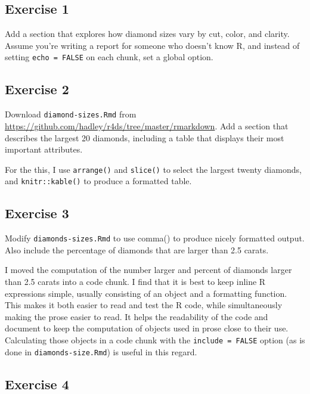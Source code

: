 \documentclass[]{book}
\theoremstyle{plain}
\theoremstyle{remark}
\theoremstyle{definition}
\theoremstyle{definition}
\theoremstyle{definition}
\theoremstyle{remark}
\begin{document}
\hypertarget{exercise-1-72}{%
\subsection{Exercise 1}\label{exercise-1-72}}

Add a section that explores how diamond sizes vary by cut, color, and
clarity. Assume you're writing a report for someone who doesn't know R,
and instead of setting \texttt{echo\ =\ FALSE} on each chunk, set a
global option.

\hypertarget{exercise-2-70}{%
\subsection{Exercise 2}\label{exercise-2-70}}

Download \texttt{diamond-sizes.Rmd} from
\url{https://github.com/hadley/r4ds/tree/master/rmarkdown}. Add a
section that describes the largest 20 diamonds, including a table that
displays their most important attributes.

For the this, I use \texttt{arrange()} and \texttt{slice()} to select
the largest twenty diamonds, and \texttt{knitr::kable()} to produce a
formatted table.

\hypertarget{exercise-3-56}{%
\subsection{Exercise 3}\label{exercise-3-56}}

Modify \texttt{diamonds-sizes.Rmd} to use comma() to produce nicely
formatted output. Also include the percentage of diamonds that are
larger than 2.5 carats.

I moved the computation of the number larger and percent of diamonds
larger than 2.5 carats into a code chunk. I find that it is best to keep
inline R expressions simple, usually consisting of an object and a
formatting function. This makes it both easier to read and test the R
code, while simultaneously making the prose easier to read. It helps the
readability of the code and document to keep the computation of objects
used in prose close to their use. Calculating those objects in a code
chunk with the \texttt{include\ =\ FALSE} option (as is done in
\texttt{diamonds-size.Rmd}) is useful in this regard.

\hypertarget{exercise-4-41}{%
\subsection{Exercise 4}\label{exercise-4-41}}
\end{document}
